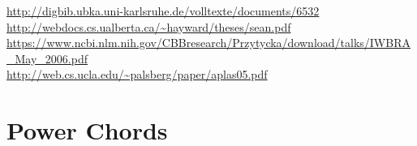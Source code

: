 \url{http://digbib.ubka.uni-karlsruhe.de/volltexte/documents/6532}\\
\url{http://webdocs.cs.ualberta.ca/~hayward/theses/sean.pdf}\\
\url{https://www.ncbi.nlm.nih.gov/CBBresearch/Przytycka/download/talks/IWBRA_May_2006.pdf}\\
\url{http://web.cs.ucla.edu/~palsberg/paper/aplas05.pdf}\\

\section{Power Chords}
